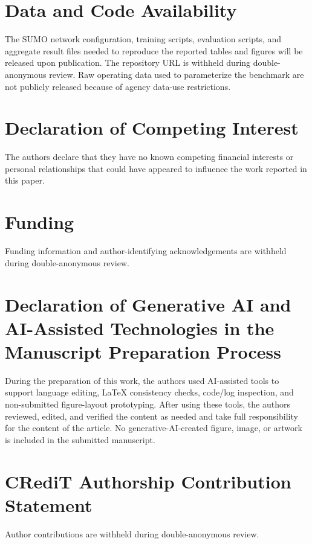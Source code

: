\section*{Data and Code Availability}

The SUMO network configuration, training scripts, evaluation scripts, and aggregate result files needed to reproduce the reported tables and figures will be released upon publication.
The repository URL is withheld during double-anonymous review.
Raw operating data used to parameterize the benchmark are not publicly released because of agency data-use restrictions.

\section*{Declaration of Competing Interest}

The authors declare that they have no known competing financial interests or personal relationships that could have appeared to influence the work reported in this paper.

\section*{Funding}

Funding information and author-identifying acknowledgements are withheld during double-anonymous review.

\section*{Declaration of Generative AI and AI-Assisted Technologies in the Manuscript Preparation Process}

During the preparation of this work, the authors used AI-assisted tools to support language editing, LaTeX consistency checks, code/log inspection, and non-submitted figure-layout prototyping.
After using these tools, the authors reviewed, edited, and verified the content as needed and take full responsibility for the content of the article.
No generative-AI-created figure, image, or artwork is included in the submitted manuscript.

\section*{CRediT Authorship Contribution Statement}

Author contributions are withheld during double-anonymous review.
